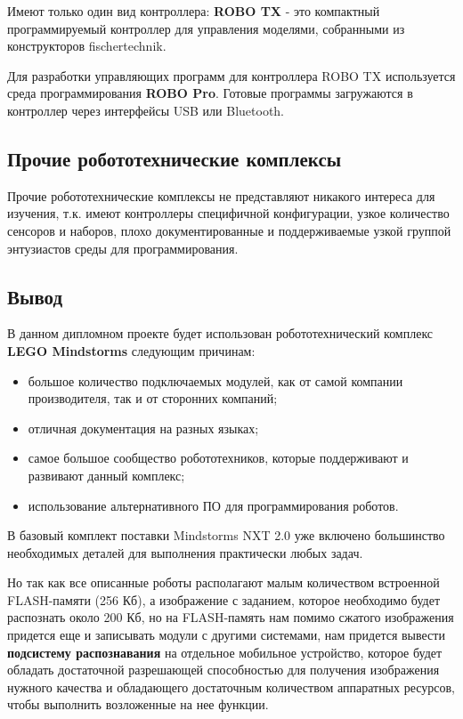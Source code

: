 Имеют только один вид контроллера: \textbf{ROBO TX} - это компактный программируемый контроллер для управления моделями, собранными из конструкторов fischertechnik.

Для разработки управляющих программ для контроллера ROBO TX используется среда программирования \textbf{ROBO Pro}. Готовые программы загружаются в контроллер через интерфейсы USB или Bluetooth.

\subsection{Прочие робототехнические комплексы}

Прочие робототехнические комплексы не представляют никакого интереса для изучения, т.к.  имеют контроллеры специфичной конфигурации, узкое количество сенсоров и наборов, плохо документированные и поддерживаемые узкой группой энтузиастов среды для программирования.

\subsection{Вывод}
В данном дипломном проекте будет использован робототехнический комплекс \textbf{LEGO Mindstorms} следующим причинам:
\begin{itemize}
\item большое количество подключаемых модулей, как от самой компании производителя, так и от сторонних компаний;
\item отличная документация на разных языках;
\item самое большое сообщество робототехников, которые поддерживают и развивают данный комплекс;
\item использование альтернативного ПО для программирования роботов.
\end{itemize}

В базовый комплект поставки Mindstorms NXT 2.0 уже включено большинство необходимых деталей для выполнения практически любых задач.

Но так как все описанные роботы располагают малым количеством встроенной FLASH-памяти (256 Кб), а изображение с заданием, которое необходимо будет распознать около 200 Кб, но на FLASH-память нам помимо сжатого изображения придется еще и записывать модули с другими системами, нам придется вывести \textbf{подсистему распознавания} на отдельное мобильное устройство, которое будет обладать достаточной разрешающей способностью для получения изображения нужного качества и обладающего достаточным количеством аппаратных ресурсов, чтобы выполнить возложенные на нее функции.


